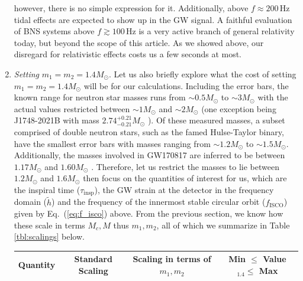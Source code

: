 \documentclass[amsmath,amssymb,aps,floats,amsfonts,notitlepage,superscriptaddress,eqsecnum,nofootinbib,10pt]{revtex4-1}
\begin{document}
\begin{enumerate}
however, there is no simple expression for it.
Additionally, above $f \approx 200\,$Hz tidal effects are expected to show up in the GW signal.
A faithful evaluation of BNS systems above $f\gtrsim 100\,$Hz is a very active branch of general relativity today,
but beyond the scope of this article. As we showed above, our disregard for relativistic effects costs us a few seconds at most.%
%
\item {\it Setting} $m_1=m_2=1.4 M_\odot$.
Let us also briefly explore what the cost of setting $m_1=m_2=1.4 M_\odot$ will be for our calculations. 
Including the error bars, the known range for neutron star masses runs from $\sim 0.5 M_\odot$ to $ \sim 3 M_\odot$ with the actual values restricted
between $\sim 1 M_\odot$ and $\sim 2 M_\odot$ \cite{Ozel_Freire} (one exception being J1748-2021B with mass $2.74^{+0.21}_{-0.21} M_\odot $ \cite{Freire_et_al_2007}).
Of these measured masses, a subset comprised of double neutron stars, such as the famed Hulse-Taylor binary, have the smallest error bars with masses
ranging from $\sim 1.2 M_\odot$ to $\sim 1.5 M_\odot$. 
Additionally, the masses involved in GW170817 are inferred to be between $1.17 M_\odot$ and $1.60 M_\odot$ \cite{GW170817}.
Therefore, let us restrict the masses to lie between $1.2 M_\odot$ and $1.6 M_\odot$ then focus on %
the quantities of interest for us, which are %
the inspiral time ($\tau_\text{insp}$), the GW strain at the detector in the frequency domain ($\tilde{h}$) and
the frequency of the innermost stable circular orbit ($f_\text{ISCO}$) given by Eq.~(\ref{eq:f_isco}) above.
From the previous section, we know how these scale in terms $M_c, M$ thus $m_1, m_2$, all of which we summarize in Table \ref{tbl:scalings} below.
%
\begin{center}
\begin{table}[ht]
\begin{tabular}{|l|ccc|}
\hline
 Quantity & Standard Scaling & Scaling in terms of $m_1,m_2$ & Min $\le$ Value$_{1.4} \le$ Max\\
\hline

\end{tabular}
\end{table}
\end{center}
\end{enumerate}
\end{document}
